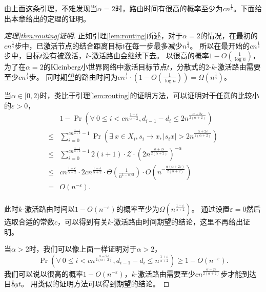 由上面这条引理，不难发现当$\alpha = 2$时，路由时间有很高的概率至少为$cn^{\frac{1}{4}}$。下面给出本章给出的定理的证明。

\begin{proof}[定理\ref{thm:routing}证明]
正如引理\ref{lem:routing}所述，对于$\alpha = 2$的情况，在最初的$cn^{\frac{1}{4}}$步中，已激活节点的结合距离目标$t$在每一步最多减少$n^{\frac{1}{4}}$。
所以在最开始的$cn^{\frac{1}{4}}$步中，目标$t$没有被激活，$k$-激活路由会继续下去。
以很高的概率$1-O(\frac{1}{\log n})$，为了在$\alpha=2$的Kleinberg小世界网络中激活目标节点$t$，分散式的$2$-$k$-激活路由需要至少$cn^{\frac{1}{4}}$步。
同时期望的路由时间为$cn^{\frac{1}{4}} \cdot (1-O(\frac{1}{\log n})) = \Omega(n^{\frac{1}{4}})$。

当$\alpha\in [0,2)$时，类比于引理\ref{lem:routing}的证明方法，可以证明对于任意的比较小的$\varepsilon > 0$，
\begin{equation*}
\begin{array}{ll}
& 1- \Pr(\forall~0 \leq i < cn^{\frac{1-\varepsilon}{\alpha+2}},
d_{i-1}-d_{i}\leq 2n^{\frac{\alpha + 2\varepsilon}{2(\alpha+2)}})\\
\leq & \sum_{i=0}^{cn^{\frac{1-\varepsilon}{\alpha+2}}-1}\Pr(\exists~x \in X_i, s_i \to x,
|s_ix| > 2n^{\frac{\alpha + 2\varepsilon}{2(\alpha+2)}})\\
\leq & \sum_{i=0}^{cn^{\frac{1-\varepsilon}{\alpha+2}}-1} 2(i+1) \cdot \mathcal{Z} \cdot (2n^{\frac{\alpha + 2\varepsilon}{2(\alpha+2)}})^{-\alpha} \\
\leq & cn^{\frac{1-\varepsilon}{\alpha+2}}
\cdot 2cn^{\frac{1-\varepsilon}{\alpha+2}} \cdot \Theta(\frac{1}{n^{1-\alpha/2}})\cdot
O(n^{-\frac{\alpha(\alpha + 2\varepsilon)}{2(\alpha+2)}})\\
= & O(n^{-\varepsilon}).\\
\end{array}
\end{equation*}

此时$k$-激活路由时间以$1-O(n^{-\varepsilon})$的概率至少为$\Omega(n^{\frac{1-\varepsilon}{\alpha+2}})$。
通过设置$\varepsilon = 0$然后选取合适的常数$c$，可以得到有关$k$-激活路由时间期望的结论，这里不再给出证明。

当$ \alpha >2$时，我们可以像上面一样证明对于$ \alpha >2$，
$$\Pr(\forall~0 \leq i < cn^{\frac{\alpha-2\varepsilon}{2(\alpha+2)}},
d_{i-1}-d_{i}\leq n^{\frac{1 + \varepsilon}{\alpha+2}}) \geq 1-O(n^{-\varepsilon}).$$
我们可以说以很高的概率$1-O(n^{-\varepsilon})$，$k$-激活路由需要至少$cn^{\frac{\alpha-2\varepsilon}{2(\alpha+2)}}$步才能到达目标$t$。
用类似的证明方法可以得到期望的结论。


\end{proof}
